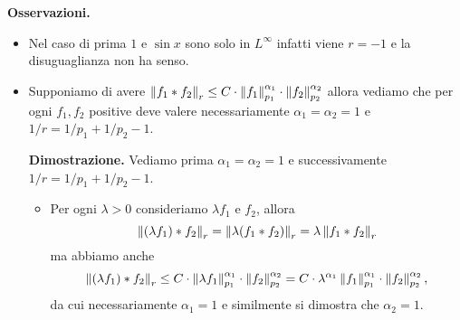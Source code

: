 \textbf{Osservazioni.}
\begin{itemize}
	\item 
		Nel caso di prima $1$ e $\sin x$ sono solo in $L^\infty$ infatti viene $r = -1$ e la disuguaglianza non ha senso.





	\item Supponiamo di avere $\left\lVert f_1 \ast f_2 \right\rVert_r \leq C \cdot \left\lVert f_1 \right\rVert_{p_1}^{\alpha_1} \cdot \left\lVert f_2 \right\rVert_{p_2}^{\alpha_2}$ allora vediamo che per ogni $f_1, f_2$ positive deve valere necessariamente $\alpha_1 = \alpha_2 = 1$ e $1/r = 1/p_1 + 1/p_2 - 1$.

	\textbf{Dimostrazione.} Vediamo prima $\alpha_1 = \alpha_2 = 1$ e successivamente $1/r = 1/p_1 + 1/p_2 - 1$.
	\begin{itemize}
	
		\item Per ogni $\lambda > 0$ consideriamo $\lambda f_1$ e $f_2$, allora 
		$$
			\left\lVert (\lambda f_1) \ast f_2 \right\rVert_r = \left\lVert \lambda (f_1 \ast f_2) \right\rVert_r = \lambda \left\lVert f_1 \ast f_2 \right\rVert_r
		$$
		ma abbiamo anche
		$$
			\left\lVert (\lambda f_1) \ast f_2 \right\rVert_r \leq C \cdot \left\lVert \lambda f_1 \right\rVert_{p_1}^{\alpha_1} \cdot \left\lVert f_2 \right\rVert_{p_2}^{\alpha_2} = C \cdot \lambda^{\alpha_1} \left\lVert f_1 \right\rVert_{p_1}^{\alpha_1} \cdot \left\lVert f_2 \right\rVert_{p_2}^{\alpha_2},
		$$
		da cui necessariamente $\alpha_1 = 1$ e similmente si dimostra che $\alpha_2 = 1$.


\end{itemize}
\end{itemize}

